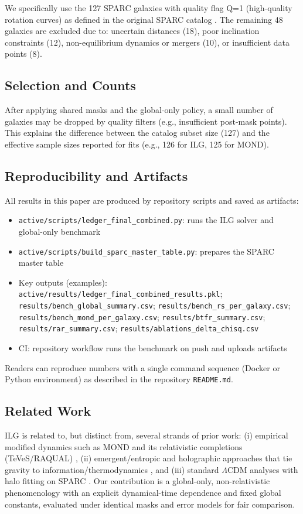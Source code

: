 \documentclass[12pt,a4paper]{article}
\begin{document}
We specifically use the 127 SPARC galaxies with quality flag Q=1 (high-quality rotation curves) as defined in the original SPARC catalog \citep{lelli2016sparc}. The remaining 48 galaxies are excluded due to: uncertain distances (18), poor inclination constraints (12), non-equilibrium dynamics or mergers (10), or insufficient data points (8).

\subsection{Selection and Counts}
\noindent After applying shared masks and the global-only policy, a small number of galaxies may be dropped by quality filters (e.g., insufficient post-mask points). This explains the difference between the catalog subset size (127) and the effective sample sizes reported for fits (e.g., 126 for ILG, 125 for MOND).

\subsection{Reproducibility and Artifacts}

All results in this paper are produced by repository scripts and saved as artifacts:
\begin{itemize}
  \item \texttt{active/scripts/ledger\_final\_combined.py}: runs the ILG solver and global-only benchmark
  \item \texttt{active/scripts/build\_sparc\_master\_table.py}: prepares the SPARC master table
  \item Key outputs (examples): \texttt{active/results/ledger\_final\_combined\_results.pkl}; \texttt{results/bench\_global\_summary.csv}; \texttt{results/bench\_rs\_per\_galaxy.csv}; \texttt{results/bench\_mond\_per\_galaxy.csv}; \texttt{results/btfr\_summary.csv}; \texttt{results/rar\_summary.csv}; \texttt{results/ablations\_delta\_chisq.csv}
  \item CI: repository workflow runs the benchmark on push and uploads artifacts
\end{itemize}

Readers can reproduce numbers with a single command sequence (Docker or Python environment) as described in the repository \texttt{README.md}.

\subsection{Related Work}
\noindent ILG is related to, but distinct from, several strands of prior work: (i) empirical modified dynamics such as MOND and its relativistic completions (TeVeS/RAQUAL) \citep{milgrom1983,bekenstein2004,famaey2012}, (ii) emergent/entropic and holographic approaches that tie gravity to information/thermodynamics \citep{verlinde2011,verlinde2017}, and (iii) standard $\Lambda$CDM analyses with halo fitting on SPARC \citep{li2018}. Our contribution is a global-only, non-relativistic phenomenology with an explicit dynamical-time dependence and fixed global constants, evaluated under identical masks and error models for fair comparison.
\end{document}
